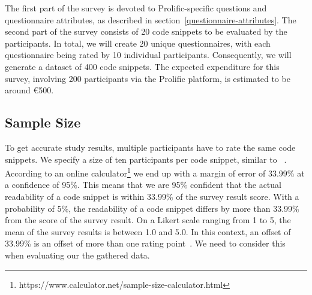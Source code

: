 \documentclass[%
class=scrreprt,
chapterprefix=false,%
open=right,%
twoside=false,%
paper=a4,%
logofile={Logo\_zentral\_farbig\_EN.png},%
thesistype=masterproposal,%
UKenglish,%
]{se2thesis}
\begin{document}
The first part of the survey is devoted to Prolific-specific questions and questionnaire attributes, as described in section~\ref{questionnaire-attributes}. The second part of the survey consists of 20 code snippets to be evaluated by the participants.
In total, we will create 20 unique questionnaires, with each questionnaire being rated by 10 individual participants. Consequently, we will generate a dataset of 400 code snippets. The expected expenditure for this survey, involving 200 participants via the Prolific platform, is estimated to be around €500.

\subsection{Sample Size}
To get accurate study results, multiple participants have to rate the same code snippets. We specify a size of ten participants per code snippet, similar to \citeauthor{scalabrino2016improving}~\cite{scalabrino2016improving}. According to an online calculator\footnote{https://www.calculator.net/sample-size-calculator.html} we end up with a margin of error of 33.99\% at a confidence of 95\%. This means that we are 95\% confident that the actual readability of a code snippet is within 33.99\% of the survey result score. With a probability of 5\%, the readability of a code snippet differs by more than 33.99\% from the score of the survey result. On a Likert scale ranging from 1 to 5, the mean of the survey results is between 1.0 and 5.0. In this context, an offset of 33.99\% is an offset of more than one rating point~\cite{likert1932technique}. We need to consider this when evaluating our the gathered data.



\end{document}
